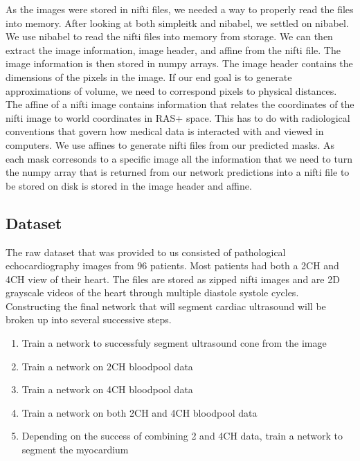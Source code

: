 \documentclass[12pt]{article}
\begin{document}
\par
As the images were stored in nifti files, we needed a way to properly read the files into memory.
After looking at both simpleitk and nibabel, we settled on nibabel.
We use nibabel to read the nifti files into memory from storage.
We can then extract the image information, image header, and affine from the nifti file.
The image information is then stored in numpy arrays.
The image header contains the dimensions of the pixels in the image.
If our end goal is to generate approximations of volume, we need to correspond pixels to physical distances.
The affine of a nifti image contains information that relates the coordinates of the nifti image to world coordinates in RAS+ space. 
This has to do with radiological conventions that govern how medical data is interacted with and viewed in computers.
We use affines to generate nifti files from our predicted masks.
As each mask corresonds to a specific image all the information that we need to turn the numpy array that is returned from our network predictions into a nifti file to be stored on disk is stored in the image header and affine.

\subsection{Dataset}
\par
The raw dataset that was provided to us consisted of pathological echocardiography images from 96 patients. 
Most patients had both a 2CH and 4CH view of their heart. The files are stored as zipped nifti images and are 2D grayscale videos of the heart through multiple diastole systole cycles.
Constructing the final network that will segment cardiac ultrasound will be broken up into several successive steps.

\begin{enumerate}
\item Train a network to successfuly segment ultrasound cone from the image
\item Train a network on 2CH bloodpool data
\item Train a network on 4CH bloodpool data
\item Train a network on both 2CH and 4CH bloodpool data
\item Depending on the success of combining 2 and 4CH data, train a network to segment the myocardium
\end{enumerate}
\end{document}
